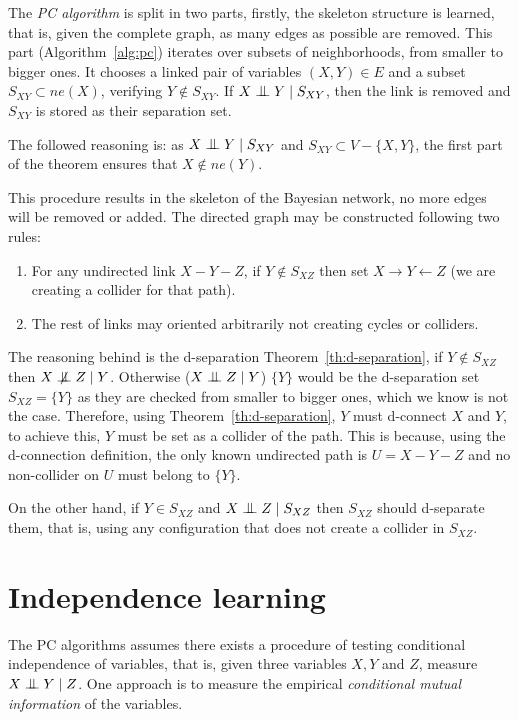 The \emph{PC algorithm} is split in two parts, firstly, the skeleton structure is learned, that is, given the complete graph, as many edges as possible are removed. This part (Algorithm~\ref{alg:pc}) iterates over subsets of neighborhoods, from smaller to bigger ones. It chooses a linked pair of variables \((X,Y) \in E\) and
a subset \(S_{XY} \subset ne(X)\), verifying \(Y \notin S_{XY}\). If \(X \bigCI Y \mid S_{XY}\), then the link is removed and \(S_{XY}\) is stored as their separation set.

The followed reasoning is: as \(X \bigCI Y \mid S_{XY}\) and \(S_{XY} \subset V - \{X,Y\}\), the first part of the theorem ensures that \(X \notin ne(Y)\).

This procedure results in the skeleton of the Bayesian network, no more edges will be removed or added. The directed graph may be constructed following two rules:
\begin{enumerate}
  \item For any undirected link \(X - Y - Z\), if \(Y \notin S_{XZ}\) then set
    \(X \to Y \leftarrow Z\) (we are creating a collider for that path).
  \item The rest of links may oriented arbitrarily not
creating cycles or colliders.
\end{enumerate}
The reasoning behind is the d-separation Theorem~\ref{th:d-separation}, if \(Y \notin S_{XZ}\) then \(X \bigCD Z \mid Y\). Otherwise (\(X \bigCI Z \mid Y\)) \(\{Y\}\) would be the d-separation set \(S_{XZ} = \{Y\}\) as they are checked from smaller to bigger ones, which we know is not the case. Therefore, using Theorem~\ref{th:d-separation}, \(Y\) must d-connect \(X\) and \(Y\), to achieve this, \(Y\)  must be set as a collider of the path. This is because, using the d-connection definition, the only known undirected path is \(U = X - Y - Z\) and no non-collider on \(U\) must belong to \(\{Y\}\).

On the other hand, if \(Y \in S_{XZ}\) and \(X \bigCI Z \mid S_{XZ}\) then \(S_{XZ}\) should d-separate them, that is, using any configuration that does not create a collider in \(S_{XZ}\).

\section{Independence learning}

The PC algorithms assumes there exists a procedure of testing conditional independence of variables, that is, given three variables \(X, Y\) and \( Z \),  measure \(X \bigCI Y \mid Z\). One approach is to measure the empirical \emph{conditional mutual information} of the variables.

